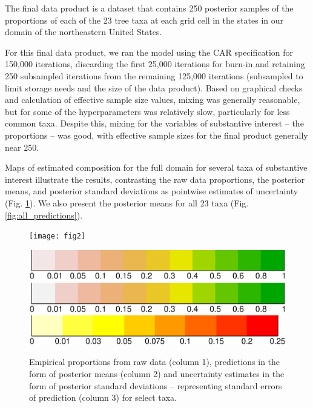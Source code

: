 \documentclass[12pt]{article}
\begin{document}
The final data product is a dataset that contains 250 posterior samples
of the proportions of each of the 23 tree taxa at each grid cell in
the states in our domain of the northeastern United States.

For this final data product, we ran the model using the CAR specification
for 150,000 iterations, discarding the first 25,000 iterations for
burn-in and retaining 250 subsampled iterations from the remaining
125,000 iterations (subsampled to limit storage needs and the size
of the data product). Based on graphical checks and calculation of
effective sample size values, mixing was generally reasonable, but
for some of the hyperparameters was relatively slow, particularly
for less common taxa. Despite this, mixing for the variables of substantive
interest -- the proportions -- was good, with effective sample sizes
for the final product generally near 250.

Maps of estimated composition for the full domain for several taxa
of substantive interest illustrate the results, contrasting the raw
data proportions, the posterior means, and posterior standard deviations
as pointwise estimates of uncertainty (Fig. \ref{fig:select_maps}).
We also present the posterior means for all 23 taxa (Fig. \ref{fig:all_predictions}).

\begin{figure}
\texttt{[image: fig2]}

\hspace{4mm}\includegraphics[scale=0.16]{legendRaw}\hspace{4mm}\includegraphics[scale=0.16]{legendProp}\hspace{3.5mm}\includegraphics[scale=0.16]{legendSD}

\caption{Empirical proportions from raw data (column 1), predictions in the
form of posterior means (column 2) and uncertainty estimates in the
form of posterior standard deviations -- representing standard errors
of prediction (column 3) for select taxa. \label{fig:select_maps}}
\end{figure}
\end{document}
